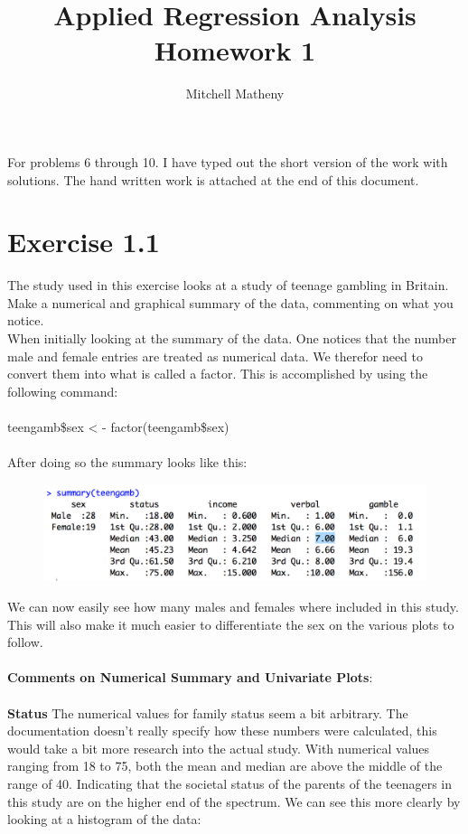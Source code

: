 \documentclass{exam}
\title{\textbf{Applied Regression Analysis}\large\\
	 \textbf{Homework 1}}
\author{Mitchell Matheny}
\begin{document}
	\maketitle{}
	For problems 6 through 10. I have typed out the short version of the work with solutions. The hand written work is attached at the end of this document. 
	\pagebreak
	\section{Exercise 1.1}
	The study used in this exercise looks at a study of teenage gambling in Britain. Make a numerical and graphical summary of the data, commenting on what you notice.
	\\
	When initially looking at the summary of the data. One notices that the number male and female entries are treated as numerical data. We therefor need to convert them into what is called a factor. This is accomplished by using the following command: 
	\\
	\\
	teengamb\$sex < - factor(teengamb\$sex)
	\\
	\\
	After doing so the summary looks like this: 
	
	\begin{figure}[h]
		\includegraphics[scale=.6]{summary}
		\centering
		
	\end{figure}
	
	\noindent
	We can now easily see how many males and females where included in this study. This will also make it much easier to differentiate the sex on the various plots to follow. 
	\\
	\\
	\textbf{Comments on Numerical Summary and Univariate Plots}: 
	\\
	\\
	\textbf{Status}
	The numerical values for family status seem a bit arbitrary. The documentation doesn’t really specify how these numbers were calculated, this would take a bit more research into the actual study. With numerical values ranging from 18 to 75, both the mean and median are above the middle of the range of 40. Indicating that the societal status of the parents of the teenagers in this study are on the higher end of the spectrum. We can see this more clearly by looking at a histogram of the data:
	
\end{document}
